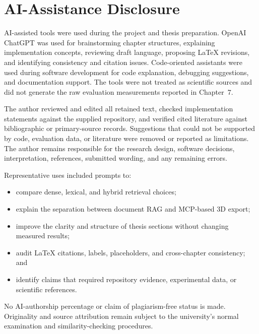 \chapter{AI-Assistance Disclosure}
\label{app:ai-disclosure}

AI-assisted tools were used during the project and thesis preparation. OpenAI ChatGPT was used for brainstorming chapter structures, explaining implementation concepts, reviewing draft language, proposing LaTeX revisions, and identifying consistency and citation issues. Code-oriented assistants were used during software development for code explanation, debugging suggestions, and documentation support. The tools were not treated as scientific sources and did not generate the raw evaluation measurements reported in Chapter~7.

The author reviewed and edited all retained text, checked implementation statements against the supplied repository, and verified cited literature against bibliographic or primary-source records. Suggestions that could not be supported by code, evaluation data, or literature were removed or reported as limitations. The author remains responsible for the research design, software decisions, interpretation, references, submitted wording, and any remaining errors.

Representative uses included prompts to:
\begin{itemize}
  \item compare dense, lexical, and hybrid retrieval choices;
  \item explain the separation between document RAG and MCP-based 3D export;
  \item improve the clarity and structure of thesis sections without changing measured results;
  \item audit LaTeX citations, labels, placeholders, and cross-chapter consistency; and
  \item identify claims that required repository evidence, experimental data, or scientific references.
\end{itemize}

No AI-authorship percentage or claim of plagiarism-free status is made. Originality and source attribution remain subject to the university's normal examination and similarity-checking procedures.
